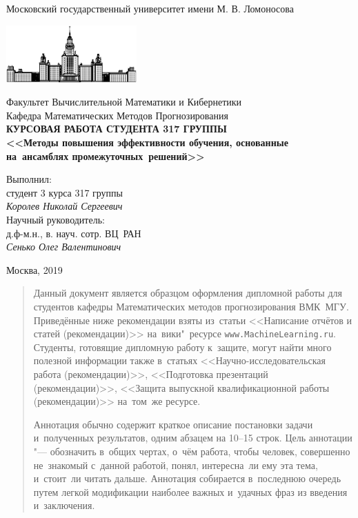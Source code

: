\documentclass[12pt, fleqn]{article}
\begin{document}
\begin{titlepage}
\begin{center}
    Московский государственный университет имени М. В. Ломоносова

    \bigskip
    \includegraphics[width=50mm]{msu.eps}

    \bigskip
    Факультет Вычислительной Математики и Кибернетики\\
    Кафедра Математических Методов Прогнозирования\\[10mm]

    \textsf{\large\bfseries
        КУРСОВАЯ РАБОТА СТУДЕНТА 317 ГРУППЫ\\[10mm]
        <<Методы повышения эффективности обучения, основанные на~ансамблях промежуточных~решений>>
    }\\[10mm]

    \begin{flushright}
        \parbox{0.5\textwidth}{
            Выполнил:\\
            студент 3 курса 317 группы\\
            \emph{Королев Николай Сергеевич}\\[5mm]
            Научный руководитель:\\
            д.ф-м.н., в. науч. сотр. ВЦ~РАН\\
            \emph{Сенько Олег Валентинович}
        }
    \end{flushright}

    \vspace{\fill}
    Москва, 2019
\end{center}
\end{titlepage}

\newpage
\renewcommand{\contentsname}{Содержание}
\tableofcontents

\newpage
\begin{abstract}
    Данный документ является образцом оформления дипломной работы для студентов кафедры 
    Математических методов прогнозирования ВМК~МГУ. 
    Приведённые ниже рекомендации взяты из~статьи
    <<Написание отчётов и статей (рекомендации)>>
    на~вики"~ресурсе \texttt{www.MachineLearning.ru}.
    Студенты, готовящие дипломную работу к~защите, 
    могут найти много полезной информации также в~статьях 
    <<Научно-исследовательская работа (рекомендации)>>,
    <<Подготовка презентаций (рекомендации)>>,
    <<Защита выпускной квалификационной работы (рекомендации)>>
    на~том~же ресурсе. 

    Аннотация обычно содержит 
    краткое описание постановки задачи и~полученных результатов,
    одним абзацем на 10--15 строк.
    Цель аннотации "--- обозначить в~общих чертах, о~чём работа,
    чтобы человек, совершенно не~знакомый с~данной работой,
    понял, интересна~ли ему эта тема, и~стоит~ли читать дальше.
    Аннотация собирается в~последнюю очередь
    путем легкой модификации наиболее важных и~удачных фраз из введения и~заключения.
\end{abstract}
\end{document}
